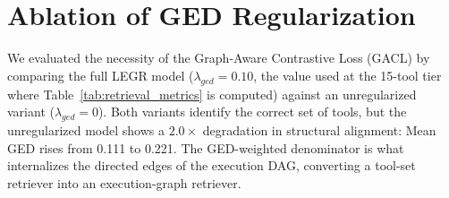 \documentclass{article}
\begin{document}
\section{Ablation of GED Regularization}

We evaluated the necessity of the Graph-Aware Contrastive Loss (GACL) by comparing the full LEGR model ($\lambda_{ged}=0.10$, the value used at the 15-tool tier where Table~\ref{tab:retrieval_metrics} is computed) against an unregularized variant ($\lambda_{ged}=0$). Both variants identify the correct set of tools, but the unregularized model shows a $2.0\times$ degradation in structural alignment: Mean GED rises from 0.111 to 0.221. The GED-weighted denominator is what internalizes the directed edges of the execution DAG, converting a tool-set retriever into an execution-graph retriever.
\end{document}
